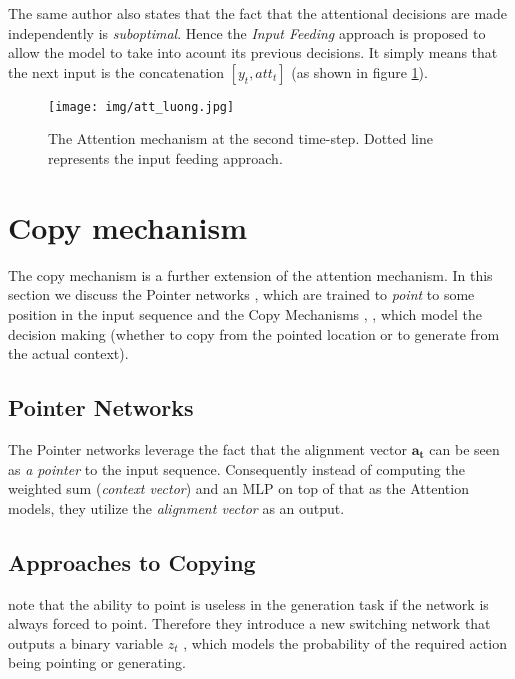 The same author also states that the fact that the attentional decisions are made independently is \emph{suboptimal}. Hence the \emph{Input Feeding} approach is proposed to allow the model to take into acount its previous decisions. It simply means that the next input is the concatenation $[y_t, att_t]$ (as shown in figure \ref{figure:input_feeding_attention}).

\begin{figure}[!h]
    \centering
    \texttt{[image: img/att\_luong.jpg]}
    \caption{\centering The Attention mechanism at the second time-step. Dotted line represents the input feeding approach.} \label{figure:input_feeding_attention}
\end{figure}


\section{Copy mechanism} \label{section:copy_mechanism}
The copy mechanism is a further extension of the attention mechanism. In this section we discuss the Pointer networks \citep{vinyals2015pointer}, which are trained to \emph{point} to some position in the input sequence and the Copy Mechanisms \citep{gulcehre2016pointing}, \citep{gu2016incorporating}, \citep{yang2016referenceaware} which model the decision making (whether to copy from the pointed location or to generate from the actual context).

\subsection{Pointer Networks}

The Pointer networks \citep{vinyals2015pointer} leverage the fact that the alignment vector $\boldsymbol{a_t}$  can be seen as \emph{a pointer} to the input sequence. Consequently instead of computing the weighted sum (\emph{context vector}) and an MLP on top of that as the Attention models, they utilize the \emph{alignment vector} as an output.

\subsection{Approaches to Copying}

\citet{gulcehre2016pointing} note that the ability to point is useless in the generation task if the network is always forced to point. Therefore they introduce a new switching network that outputs a binary variable $z_t$ , which models the probability of the required action being pointing or generating.

